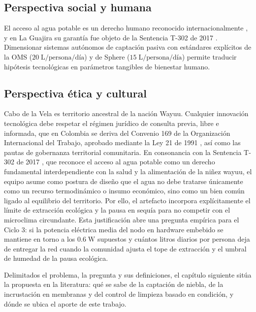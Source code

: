 \subsection{Perspectiva social y humana}
El acceso al agua potable es un derecho humano reconocido internacionalmente \parencite{onu2010agua}, y en La Guajira su garant\'ia fue objeto de la Sentencia T-302 de 2017 \parencite{corte2017t302}. Dimensionar sistemas aut\'onomos de captaci\'on pasiva con est\'andares expl\'icitos de la OMS ($20\;\text{L/persona/d\'ia}$) \parencite{howard2020domestic} y de Sphere ($15\;\text{L/persona/d\'ia}$) \parencite{sphere2018handbook} permite traducir hip\'otesis tecnol\'ogicas en par\'ametros tangibles de bienestar humano.

\subsection{Perspectiva \'etica y cultural}
Cabo de la Vela es territorio ancestral de la naci\'on Wayuu. Cualquier innovaci\'on tecnol\'ogica debe respetar el r\'egimen jur\'idico de consulta previa, libre e informada, que en Colombia se deriva del Convenio 169 de la Organizaci\'on Internacional del Trabajo, aprobado mediante la Ley 21 de 1991 \parencite{ley21de1991}, as\'i como las pautas de gobernanza territorial comunitaria. En consonancia con la Sentencia T-302 de 2017 \parencite{corte2017t302}, que reconoce el acceso al agua potable como un derecho fundamental interdependiente con la salud y la alimentaci\'on de la ni\~nez wayuu, el equipo asume como postura de dise\~no que el agua no debe tratarse \'unicamente como un recurso termodin\'amico o insumo econ\'omico, sino como un bien com\'un ligado al equilibrio del territorio. Por ello, el artefacto incorpora expl\'icitamente el l\'imite de extracci\'on ecol\'ogica y la pausa en sequ\'ia para no competir con el microclima circundante. Esta justificaci\'on abre una pregunta emp\'irica para el Ciclo 3: si la potencia el\'ectrica media del nodo en hardware embebido se mantiene en torno a los $0.6\;\text{W}$ supuestos y cu\'antos litros diarios por persona deja de entregar la red cuando la comunidad ajusta el tope de extracci\'on y el umbral de humedad de la pausa ecol\'ogica.

Delimitados el problema, la pregunta y sus definiciones, el cap\'itulo siguiente sit\'ua la propuesta en la literatura: qu\'e se sabe de la captaci\'on de niebla, de la incrustaci\'on en membranas y del control de limpieza basado en condici\'on, y d\'onde se ubica el aporte de este trabajo.

